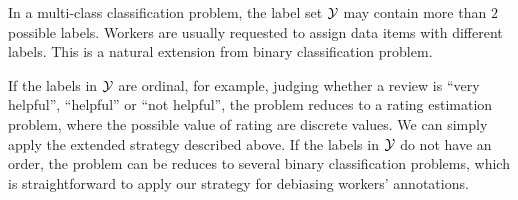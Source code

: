 In a multi-class classification problem, 
the label set ${\mathcal{Y}}$ may contain more than $2$ possible labels.  
Workers are usually requested to assign data items with different labels.  
This is a natural extension from binary classification problem.  

If the labels in ${\mathcal{Y}}$ are ordinal, 
for example, judging whether a review is ``very helpful'', ``helpful'' or ``not helpful'', 
the problem reduces to a rating estimation problem, 
where the possible value of rating are discrete values.  
We can simply apply the extended strategy described above.  
If the labels in ${\mathcal{Y}}$ do not have an order, 
the problem can be reduces to several binary classification problems, 
which is straightforward to apply our strategy for debiasing workers' annotations.  


